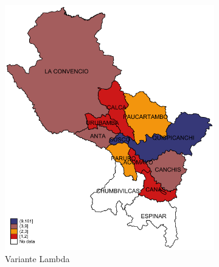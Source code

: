\documentclass[12pt,a4paper,openany]{book}
\begin{document}
	\begin{figure}[h]
		\caption{Distribución provincial de las variantes de SARS-CoV-2 aisladas en la Región Cusco hasta la SE 21-2022.}
		\label{fig:mapa_variantes}
		\centering
		\begin{subfigure}[b]{0.40\textwidth}
			\centering
			\includegraphics[width=\textwidth]{../figuras/variantes_provincial_lambda.pdf}
			\caption{Variante Lambda}
		\end{subfigure}
		\hfill
		\begin{subfigure}[b]{0.40\textwidth}
			\centering

\end{subfigure}
\end{figure}
\end{document}
